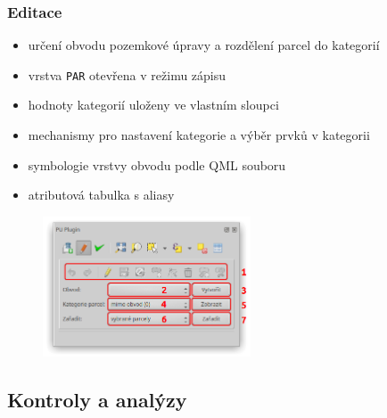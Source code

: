 \documentclass{beamer}
\begin{document}
\begin{frame}

\frametitle{Editace}

\begin{itemize}
	\item určení obvodu pozemkové úpravy a rozdělení parcel do kategorií
	\item vrstva \texttt{PAR} otevřena v režimu zápisu
	\item hodnoty kategorií uloženy ve vlastním sloupci
	\item mechanismy pro nastavení kategorie a výběr prvků v kategorii
	\item symbologie vrstvy obvodu podle QML souboru
	\item atributová tabulka s aliasy
\end{itemize}


\begin{figure}[ht]
	\includegraphics[width=0.55\textwidth]{pictures/editace_gui.png}
\end{figure}

\end{frame}


\subsection{Kontroly a analýzy}
\end{document}
